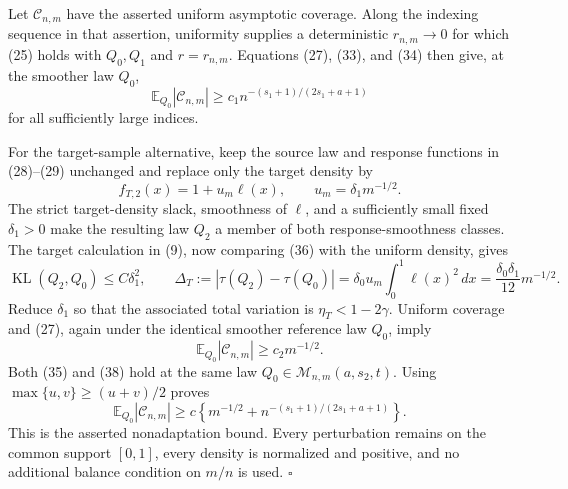 Let \(\mathcal C_{n,m}\) have the asserted uniform asymptotic coverage.  Along the indexing sequence in that assertion, uniformity supplies a deterministic \(r_{n,m}\to0\) for which (25) holds with \(Q_0,Q_1\) and \(r=r_{n,m}\).  Equations (27), (33), and (34) then give, at the smoother law \(Q_0\),
\[
\mathbb E_{Q_0}|\mathcal C_{n,m}|
\ge c_1n^{-(s_1+1)/(2s_1+a+1)}
\tag{35}
\]
for all sufficiently large indices.

For the target-sample alternative, keep the source law and response functions in (28)--(29) unchanged and replace only the target density by
\[
f_{T,2}(x)=1+u_m\ell(x),
\qquad
u_m=\delta_1m^{-1/2}.
\tag{36}
\]
The strict target-density slack, smoothness of \(\ell\), and a sufficiently small fixed \(\delta_1>0\) make the resulting law \(Q_2\) a member of both response-smoothness classes.  The target calculation in (9), now comparing (36) with the uniform density, gives
\[
\operatorname{KL}(Q_2,Q_0)\le C\delta_1^2,
\qquad
\Delta_T:=|\tau(Q_2)-\tau(Q_0)|
=\delta_0u_m\int_0^1\ell(x)^2\,dx
=\frac{\delta_0\delta_1}{12}m^{-1/2}.
\tag{37}
\]
Reduce \(\delta_1\) so that the associated total variation is \(\eta_T<1-2\gamma\).  Uniform coverage and (27), again under the identical smoother reference law \(Q_0\), imply
\[
\mathbb E_{Q_0}|\mathcal C_{n,m}|\ge c_2m^{-1/2}.
\tag{38}
\]
Both (35) and (38) hold at the same law \(Q_0\in\mathcal M_{n,m}(a,s_2,t)\).  Using \(\max\{u,v\}\ge(u+v)/2\) proves
\[
\mathbb E_{Q_0}|\mathcal C_{n,m}|
\ge c\left\{m^{-1/2}+n^{-(s_1+1)/(2s_1+a+1)}\right\}.
\]
This is the asserted nonadaptation bound.  Every perturbation remains on the common support \([0,1]\), every density is normalized and positive, and no additional balance condition on \(m/n\) is used. \(\square\)